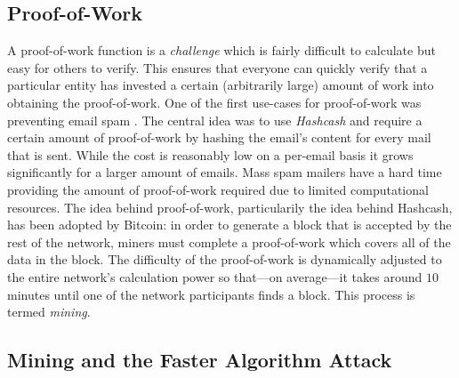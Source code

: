 \documentclass{sig-alternate}
\begin{document}
\subsection{Proof-of-Work}
\label{pow}
A proof-of-work function is a \emph{challenge} which is fairly difficult to calculate but easy for others to verify. This ensures that everyone can quickly verify that a particular entity has invested a certain (arbitrarily large) amount of work into obtaining the proof-of-work.
One of the first use-cases for proof-of-work was preventing email spam \cite{back2002hashcash}. The central idea was to use \emph{Hashcash} and require a certain amount of proof-of-work by hashing the email's content for every mail that is sent. While the cost is reasonably low on a per-email basis it grows significantly for a larger amount of emails. Mass spam mailers have a hard time providing the amount of proof-of-work required due to limited computational resources.
The idea behind proof-of-work, particularily the idea behind Hashcash, has been adopted by Bitcoin: in order to generate a block that is accepted by the rest of the network, miners must complete a proof-of-work which covers all of the data in the block. The difficulty of the proof-of-work is dynamically adjusted to the entire network's calculation power so that---on average---it takes around $10$ minutes until one of the network participants finds a block. This process is termed \emph{mining}.

\subsection{Mining and the Faster Algorithm Attack}
\end{document}
